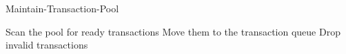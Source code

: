 \begin{algorithm}
\caption{Maintain-Transaction-Pool}
\begin{algorithmic}
    \state Scan the pool for ready transactions
    \state Move them to the transaction queue
    \state Drop invalid transactions
\end{algorithmic}
\end{algorithm}
